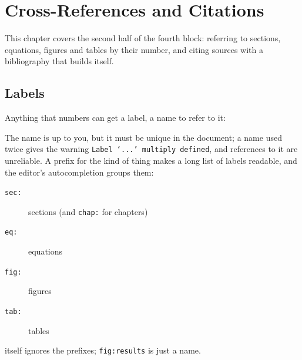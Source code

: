 \chapter{Cross-References and Citations}\label{chap:references}

This chapter covers the second half of the fourth block:
referring to sections, equations, figures and tables by their number,
and citing sources with a bibliography that builds itself.

\section{Labels}\label{sec:labels}

Anything that  numbers can get a label, a name to refer to it:



The name is up to you, but it must be unique in the document;
a name used twice gives the warning \texttt{Label `...' multiply defined},
and references to it are unreliable.
A prefix for the kind of thing makes a long list of labels readable,
and the editor's autocompletion groups them:

\begin{description}
    \item[\texttt{sec:}] sections (and \texttt{chap:} for chapters)
    \item[\texttt{eq:}] equations
    \item[\texttt{fig:}] figures
    \item[\texttt{tab:}] tables
\end{description}

 itself ignores the prefixes; \texttt{fig:results} is just a name.

